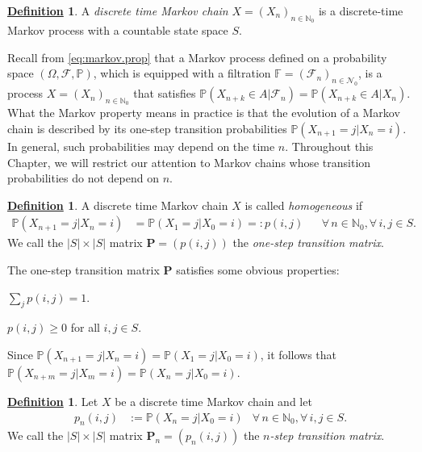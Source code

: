 \documentclass[12pt]{book}
\numberwithin{equation}{chapter}
\theoremstyle{plain}
\numberwithin{theorem}{section}
\theoremstyle{definition}
\newtheorem{definition}[theorem]{\underline{Definition}}
\numberwithin{exercise}{chapter}
\newcommand{\<}{\langle}
\renewcommand{\>}{\rangle}
\renewcommand{\(}{\left(}
\renewcommand{\)}{\right)}
\renewcommand{\[}{\left[}
\renewcommand{\]}{\right]}
\newcommand\Fb{\mathds{F}}
\newcommand\Pb{\mathds{P}}
\newcommand\Nb{\mathds{N}}
\newcommand\Fc{\mathscr{F}}
\newcommand\Nc{\mathscr{N}}
\newcommand\Om{\Omega}
\newcommand\sig{\sigma}
\newcommand\Pv{\pmb{P}}
\begin{document}
\begin{definition}
A \emph{discrete time Markov chain} $X = (X_n)_{n \in \Nb_0}$ is a discrete-time Markov process with a countable state space $S$.
\end{definition}

\noindent
Recall from \eqref{eq:markov.prop} that a Markov process defined on a probability space $(\Om,\Fc,\Pb)$, which is equipped with a filtration $\Fb = (\Fc_n)_{n \in \Nc_0}$, is a process $X = (X_n)_{n \in \Nb_0}$ that satisfies $\Pb( X_{n+k} \in A | \Fc_n) = \Pb( X_{n+k} \in A | X_n)$.  
What the Markov property means in practice is that the evolution of a Markov chain is described by its one-step transition probabilities $\Pb( X_{n+1} = j | X_n = i)$.  In general, such probabilities may depend on the time $n$.  Throughout this Chapter, we will restrict our attention to Markov chains whose transition probabilities do not depend on $n$.

\begin{definition}
A discrete time Markov chain $X$ is called \emph{homogeneous} if 
\begin{align}
\Pb( X_{n+1} = j | X_n = i)
	&=	\Pb( X_{1} = j | X_0 = i) =: p(i,j) &
	&		\forall \, n \in \Nb_0 , \forall \, i,j \in S .
\end{align}
We call the $|S| \times |S|$ matrix $\Pv = ( p(i,j) )$ the \emph{one-step transition matrix}.
\end{definition}

\noindent
The one-step transition matrix $\Pv$ satisfies some obvious properties:
\begin{enumerate*}
\item $\sum_j p(i,j) = 1$.
\item $p(i,j) \geq 0$ for all $i,j \in S$.
\end{enumerate*}

\noindent
Since $\Pb( X_{n+1} = j | X_n = i) = \Pb( X_1 = j | X_0 = i)$, it follows that $\Pb( X_{n+m} = j | X_m = i) = \Pb( X_{n} = j | X_0 = i)$.

\begin{definition}
Let $X$ be a discrete time Markov chain and let 
\begin{align}
p_n(i,j)
	&:=	\Pb( X_{n} = j | X_0 = i)
	&		\forall \, n \in \Nb_0 , \forall \, i,j \in S .
\end{align}
We call the $|S| \times |S|$ matrix $\Pv_n = ( p_n(i,j) )$ the \emph{$n$-step transition matrix}.
\end{definition}
\end{document}
